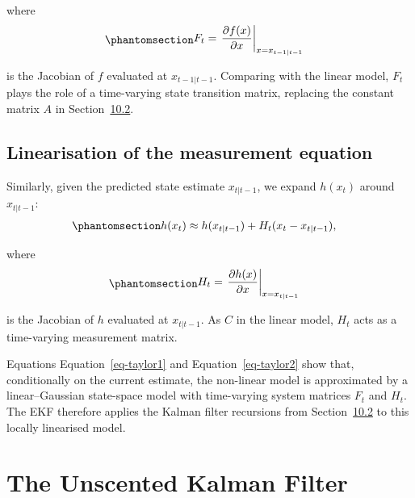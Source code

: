 \documentclass[
  letterpaper,
  DIV=11,
  numbers=noendperiod]{scrreprt}
\begin{document}
where \begin{equation}\protect\phantomsection\label{eq-gen-0132}{
\begin{align}
F_{t} &= \left.\frac{\partial f(x)}{\partial x}\right|_{x = x_{t-1|t-1}} 
\end{align}
}\end{equation}

is the Jacobian of \(f\) evaluated at \(x_{t-1|t-1}\). Comparing with
the linear model, \(F_{t}\) plays the role of a time-varying state
transition matrix, replacing the constant matrix \(A\) in
Section~\hyperref[sec:lkf]{10.2}.

\subsection*{Linearisation of the measurement
equation}\label{linearisation-of-the-measurement-equation}

Similarly, given the predicted state estimate \(x_{t|t-1}\), we expand
\(h(x_{t})\) around \(x_{t|t-1}\):
\begin{equation}\protect\phantomsection\label{eq-taylor2}{
\begin{align}
h(x_{t}) &\approx h(x_{t|t-1}) + H_{t} (x_{t} - x_{t|t-1}), 
\end{align}
}\end{equation}

where
\begin{equation}\protect\phantomsection\label{eq-taylor2_jacobian}{
\begin{align}
H_{t} &= \left.\frac{\partial h(x)}{\partial x}\right|_{x = x_{t|t-1}} 
\end{align}
}\end{equation}

is the Jacobian of \(h\) evaluated at \(x_{t|t-1}\). As \(C\) in the
linear model, \(H_{t}\) acts as a time-varying measurement matrix.

Equations Equation~\ref{eq-taylor1} and Equation~\ref{eq-taylor2} show
that, conditionally on the current estimate, the non-linear model is
approximated by a linear--Gaussian state-space model with time-varying
system matrices \(F_{t}\) and \(H_{t}\). The EKF therefore applies the
Kalman filter recursions from Section~\hyperref[sec:lkf]{10.2} to this
locally linearised model.

\section{The Unscented Kalman Filter}\label{sec:ukf}
\end{document}
